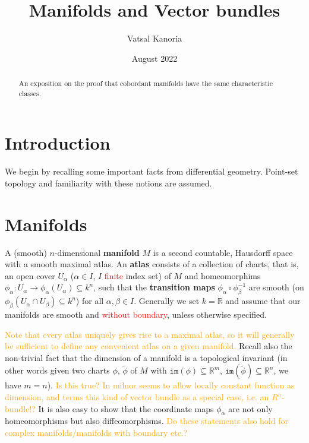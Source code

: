 \documentclass[a4paper]{article}
\theoremstyle{definition} \newtheorem*{definition}{Definition}
\theoremstyle{definition} \newtheorem*{definitions}{Definitions}
\theoremstyle{plain} \newtheorem{theorem}{Theorem}[section]
\theoremstyle{plain} \newtheorem{proposition}[theorem]{Proposition}
\theoremstyle{plain} \newtheorem{corollary}[theorem]{Corollary}
\theoremstyle{plain} \newtheorem{lemma}[theorem]{Lemma}
\theoremstyle{plain} \newtheorem{example}[theorem]{Example}
\newcommand{\checkCorrect}[1]{\textcolor{red}{#1}}
\newcommand{\understandBetter}[1]{\textcolor{orange}{#1}}
\newcommand{\question}[1]{\textcolor{orange}{#1}}
\newcommand{\defn}[1]{\textbf{#1}}
\newcommand{\realnos}{\mathbb{R}}
\begin{document}
\title{Manifolds and Vector bundles}
\author{Vatsal Kanoria}
\date{August 2022}
\maketitle
\begin{abstract}
An exposition on the proof that cobordant manifolds have the same characteristic classes.
\end{abstract}
\tableofcontents

\section{Introduction}

We begin by recalling some important facts from differential geometry. Point-set topology and familiarity with these notions are assumed.

\section{Manifolds}

A (smooth) $n$-dimensional \defn{manifold} $M$ is a second countable, Hausdorff space with a smooth maximal atlas. An \defn{atlas} consists of a collection of charts, that is, an open cover $U_\alpha$ ($\alpha\in I$, $I$ \checkCorrect{finite} index set) of $M$ and homeomorphims $\phi_\alpha:U_\alpha \to \phi_\alpha(U_\alpha) \subseteq k^n$, such that the \defn{transition maps} $\phi_\alpha \circ \phi_\beta^{-1}$ are smooth (on $\phi_\beta(U_\alpha \cap U_\beta)\subseteq k^n$) for all $\alpha, \beta\in I$. Generally we set $k=\realnos$ and assume that our manifolds are smooth and \checkCorrect{without boundary}, unless otherwise specified. 

\understandBetter{Note that every atlas uniquely gives rise to a maximal atlas, so it will generally be sufficient to define any convenient atlas on a given manifold.} Recall also the non-trivial fact that the dimension of a manifold is a topological invariant (in other words given two charts $\phi$, $\tilde{\phi}$ of $M$ with $\mathtt{im}(\phi)\subseteq \realnos^m$, $\mathtt{im}(\tilde{\phi})\subseteq \realnos^n$, we have $m=n$). \question{Is this true? In milnor seems to allow locally constant function as dimension, and terms this kind of vector bundle as a special case, i.e. an $R^n$-bundle!?} It is also easy to show that the coordinate maps $\phi_\alpha$ are not only homeomorphisms but also diffeomorphisms. \question{Do these statements also hold for complex manifolds/manifolds with boundary etc.?}
\end{document}
